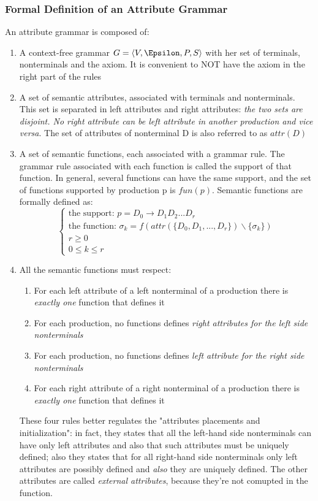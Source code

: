 \documentclass[10pt,a4paper]{article}
\begin{document}
				\subsubsection{Formal Definition of an Attribute Grammar}
					An attribute grammar is composed of:
					\begin{enumerate}
						\item A context-free grammar $G = \langle V, \Epsilon, P, S \rangle$ with her set of terminals, nonterminals and the axiom. It is convenient to NOT have the axiom in the right part of the rules
						\item A set of semantic attributes, associated with terminals and nonterminals. This set is separated in left attributes and right attributes: \emph{the two sets are disjoint. No right attribute can be left attribute in another production and vice versa}. The set of attributes of nonterminal D is also referred to as $attr(D)$
						\item A set of semantic functions, each associated with a grammar rule. The grammar rule associated with each function is called the support of that function. In general, several functions can have the same support, and the set of functions supported by production p is $fun(p)$. Semantic functions are formally defined as:
							\begin{equation}
								\begin{cases}
									\text{the support: } p = D_0 \rightarrow D_1 D_2 ... D_r\\
									\text{the function: } \sigma_k = f(attr(\{D_0, D_1, ..., D_r\}) \backslash \{\sigma_k\})\\
									r \geq 0\\
									0 \leq k \leq r
								\end{cases}
							\end{equation}
						\item All the semantic functions must respect:
							\begin{enumerate}
								\item For each left attribute of a left nonterminal of a production there is \emph{exactly one} function that defines it
								\item For each production, no functions defines \emph{right attributes for the left side nonterminals}
								\item For each production, no functions defines \emph{left attribute for the right side nonterminals}
								\item For each right attribute of a right nonterminal of a production there is \emph{exactly one} function that defines it
							\end{enumerate}
							These four rules better regulates the "attributes placements and initialization": in fact, they states that all the left-hand side nonterminals can have only left attributes and also that such attributes must be uniquely defined; also they states that for all right-hand side nonterminals only left attributes are possibly defined and \emph{also} they are uniquely defined. The other attributes are called \emph{external attributes}, because they're not comupted in the function.\\
					\end{enumerate}
					
\end{document}
